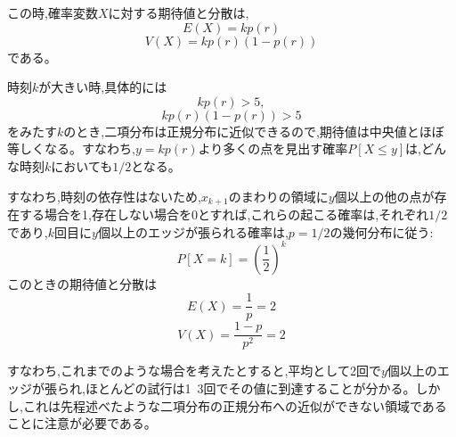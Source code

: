 この時,確率変数$X$に対する期待値と分散は,
\[E(X) = kp(r)\]
\[V(X) = kp(r)(1-p(r))\]
である。

時刻$k$が大きい時,具体的には
\[kp(r) > 5,\]
\[kp(r)(1-p(r)) > 5\]
をみたす$k$のとき,二項分布は正規分布に近似できるので,期待値は中央値とほぼ等しくなる。すなわち,$y=kp(r)$より多くの点を見出す確率$P[X\le y]$は,どんな時刻$k$においても$1/2$となる。

すなわち,時刻の依存性はないため,$x_{k+1}$のまわりの領域に$y$個以上の他の点が存在する場合を1,存在しない場合を0とすれば,これらの起こる確率は,それぞれ$1/2$であり,$k$回目に$y$個以上のエッジが張られる確率は,$p=1/2$の幾何分布に従う:
\[P[X=k] = \left( \frac{1}{2} \right)^{k}\]
このときの期待値と分散は
\[E(X) = \frac{1}{p} = 2\]
\[V(X) = \frac{1-p}{p^{2}} = 2\]

すなわち,これまでのような場合を考えたとすると,平均として2回で$y$個以上のエッジが張られ,ほとんどの試行は1~3回でその値に到達することが分かる。しかし,これは先程述べたような二項分布の正規分布への近似ができない領域であることに注意が必要である。
